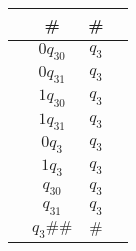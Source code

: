 \begin{frame}{}
\begin{minipage}{0.32\textwidth}
\begin{tabular}{c c |c c}
    & \# & \# &\\
    \hline
     & $0q_30$ & $q_3$ & \\
     & $0q_31$ & $q_3$ & \\
     & $1q_30$ & $q_3$ & \\
     & $1q_31$ & $q_3$ & \\
     & $0q_3$ & $q_3$ & \\
     & $1q_3$ & $q_3$ & \\
     & $q_30$ & $q_3$ & \\
     & $q_31$ & $q_3$ & \\
    \hline
     & $q_3\#\#$ & $\#$ & 
    \end{tabular} 
    \end{minipage}
    \end{frame}
    

